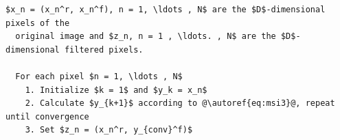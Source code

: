 \begin{lstlisting}[caption=Mean shift Segmentation, label=lst:segmalgo, mathescape, numbers=none, escapechar=@, keywordstyle=\color{black}]
  $x_n = (x_n^r, x_n^f), n = 1, \ldots , N$ are the $D$-dimensional pixels of the
  original image and $z_n, n = 1 , \ldots. , N$ are the $D$-dimensional filtered pixels.

  For each pixel $n = 1, \ldots , N$
    1. Initialize $k = 1$ and $y_k = x_n$
    2. Calculate $y_{k+1}$ according to @\autoref{eq:msi3}@, repeat until convergence
    3. Set $z_n = (x_n^r, y_{conv}^f)$ 
\end{lstlisting}


